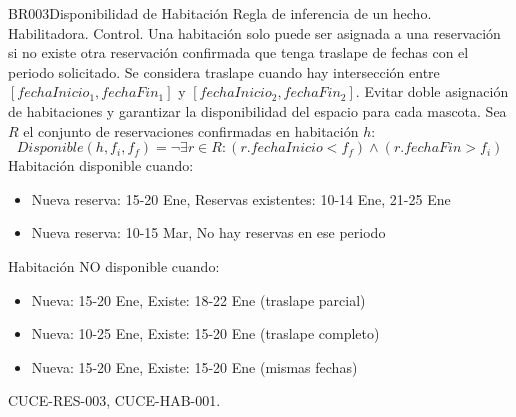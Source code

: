 \begin{BussinesRule}{BR003}{Disponibilidad de Habitación}
	\BRitem[Tipo:] Regla de inferencia de un hecho.
	\BRitem[Clase:] Habilitadora.
	\BRitem[Nivel:] Control.
	\BRitem[Descripción:] Una habitación solo puede ser asignada a una reservación si no existe otra reservación confirmada que tenga traslape de fechas con el periodo solicitado. Se considera traslape cuando hay intersección entre $[fechaInicio_1, fechaFin_1]$ y $[fechaInicio_2, fechaFin_2]$.
	\BRitem[Motivación:] Evitar doble asignación de habitaciones y garantizar la disponibilidad del espacio para cada mascota.
	\BRitem[Sentencia:] Sea $R$ el conjunto de reservaciones confirmadas en habitación $h$:
		\begin{displaymath}
			Disponible(h, f_i, f_f) = \neg\exists r \in R : (r.fechaInicio < f_f) \land (r.fechaFin > f_i)
		\end{displaymath}
	 Habitación disponible cuando:
		\begin{itemize}
			\item Nueva reserva: 15-20 Ene, Reservas existentes: 10-14 Ene, 21-25 Ene
			\item Nueva reserva: 10-15 Mar, No hay reservas en ese periodo
		\end{itemize}
	 Habitación NO disponible cuando:
		\begin{itemize}
			\item Nueva: 15-20 Ene, Existe: 18-22 Ene (traslape parcial)
			\item Nueva: 10-25 Ene, Existe: 15-20 Ene (traslape completo)
			\item Nueva: 15-20 Ene, Existe: 15-20 Ene (mismas fechas)
		\end{itemize}
	 CUCE-RES-003, CUCE-HAB-001.
\end{BussinesRule}

